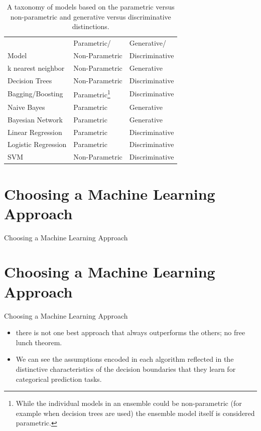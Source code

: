 \documentclass[xcolor={table}]{beamer}
\newcommand{\SectionSlide}[2][]{
	\ifthenelse{\isempty{#1}}
		{\section{#2}\begin{frame} \begin{center}\begin{huge}#2\end{huge}\end{center}\end{frame}}
		{\section[#1]{#2}\begin{frame} \begin{center}\begin{huge}#2\end{huge}\end{center}\end{frame}}
}
\begin{document}
 \begin{frame} 
\begin{table}
\caption{A taxonomy of models based on the parametric versus non-parametric and generative versus discriminative distinctions.}
\label{tab:modelTaxonomy}
\centering
\begin{footnotesize}
\begin{tabular}{l l l}
\hline
~ & Parametric/ &Generative/\\ 
Model & Non-Parametric &Discriminative\\ 
\hline
k nearest neighbor & Non-Parametric & Generative\\
Decision Trees & Non-Parametric & Discriminative\\
Bagging/Boosting & Parametric\footnote{While the individual models in an ensemble could be non-parametric (for example when decision trees are used) the ensemble model itself is considered parametric.} & Discriminative\\
Naive Bayes & Parametric & Generative\\
Bayesian Network & Parametric & Generative\\
Linear Regression & Parametric & Discriminative\\
Logistic Regression & Parametric & Discriminative\\
SVM & Non-Parametric & Discriminative\\
\hline
\end{tabular}
\end{footnotesize}
\end{table}
\end{frame} 


\SectionSlide{Choosing a Machine Learning Approach}

\begin{frame}
	\begin{itemize}
		\item there is not one best approach that always outperforms the others; \alert{no free lunch theorem}.
		\item We can see the assumptions encoded in each algorithm reflected in the distinctive characteristics of the decision boundaries that they learn for categorical prediction tasks.
	\end{itemize}
\end{frame}
\end{document}
